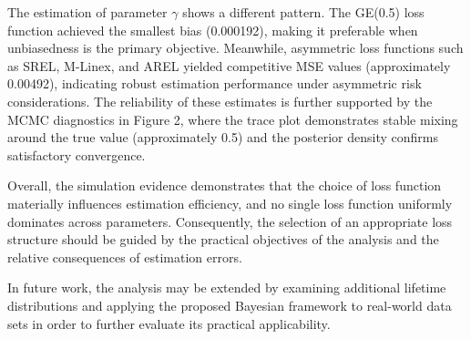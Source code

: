 \documentclass[twoside]{article}
\begin{document}
The estimation of parameter $\gamma$ shows a different pattern. The GE(0.5) loss function achieved the smallest bias (0.000192), making it preferable when unbiasedness is the primary objective. Meanwhile, asymmetric loss functions such as SREL, M-Linex, and AREL yielded competitive MSE values (approximately 0.00492), indicating robust estimation performance under asymmetric risk considerations. The reliability of these estimates is further supported by the MCMC diagnostics in Figure 2, where the trace plot demonstrates stable mixing around the true value (approximately 0.5) and the posterior density confirms satisfactory convergence.

Overall, the simulation evidence demonstrates that the choice of loss function materially influences estimation efficiency, and no single loss function uniformly dominates across parameters. Consequently, the selection of an appropriate loss structure should be guided by the practical objectives of the analysis and the relative consequences of estimation errors.

In future work, the analysis may be extended by examining additional lifetime distributions and applying the proposed Bayesian framework to real-world data sets in order to further evaluate its practical applicability.

\end{document}
